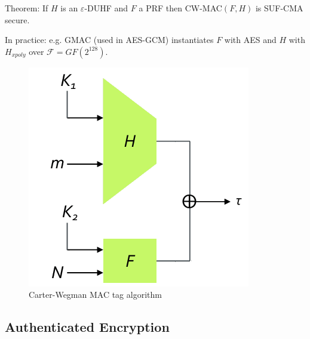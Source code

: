 Theorem:
If $H$ is an $\varepsilon$-DUHF and $F$ a PRF then CW-MAC$(F, H)$ is SUF-CMA secure.

In practice: e.g. GMAC (used in AES-GCM) instantiates $F$ with AES and $H$ with $H_{xpoly}$ over $\mathcal{F} = GF(2^{128})$.

\begin{figure}[h]
    \centering
	\includegraphics[scale=0.45]{images/carter-wegman.png}
    \caption{Carter-Wegman MAC tag algorithm}
    \label{fig:carter-wegman}
\end{figure}




\subsection{Authenticated Encryption}

